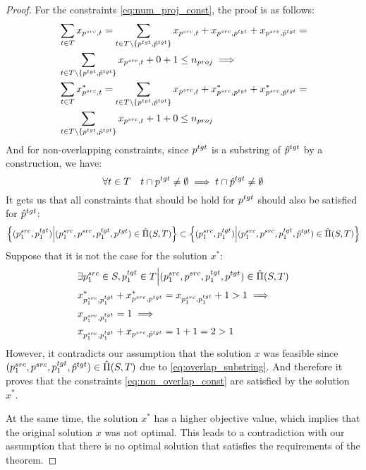 \begin{proof}
  For the constraints \eqref{eq:num_proj_const}, the proof is as follows:
  \begin{align*}
    & \sum\limits_{t \in T} x_{p^{src}, t} =
    \sum\limits_{t \in T \setminus \{ p^{tgt}, \hat{p}^{tgt} \}} x_{p^{src}, t} + x_{p^{src}, p^{tgt}} + x_{p^{src}, \hat{p}^{tgt}}  =     \\
    & \sum\limits_{t \in T \setminus \{ p^{tgt}, \hat{p}^{tgt} \}} x_{p^{src}, t} + 0 + 1
    \leq n_{proj} \implies                                                                                                                 \\
    & \sum\limits_{t \in T} x^*_{p^{src}, t} =
    \sum\limits_{t \in T \setminus \{ p^{tgt}, \hat{p}^{tgt} \}} x_{p^{src}, t} + x^*_{p^{src}, p^{tgt}} + x^*_{p^{src}, \hat{p}^{tgt}}  = \\
    & \sum\limits_{t \in T \setminus \{ p^{tgt}, \hat{p}^{tgt} \}} x_{p^{src}, t} + 1 + 0 \leq n_{proj}
  \end{align*}
  And for non-overlapping constraints, since \( p^{tgt} \) is a substring of \( \hat{p}^{tgt} \) by a
  construction, we have:
  \[
    \forall t \in T \quad t \cap p^{tgt} \neq \emptyset \implies t \cap \hat{p}^{tgt} \neq \emptyset
  \]
  It gets us that all constraints that should be hold for \( p^{tgt} \) should also be satisfied for \( \hat{p}^{tgt} \):
  \begin{equation} \label{eq:overlap_substring}
    \left\{ (p_1^{src}, p_1^{tgt}) \Big| (p_1^{src}, p^{src}, p_1^{tgt}, p^{tgt}) \in \hat{\Pi}(S, T) \right\} \subset
    \left\{ (p_1^{src}, p_1^{tgt}) \Big| (p_1^{src}, p^{src}, p_1^{tgt}, \hat{p}^{tgt}) \in \hat{\Pi}(S, T) \right\}
  \end{equation}
  Suppose that it is not the case for the solution \( x^* \):
  \begin{align*}
    & \exists p_1^{src} \in S, p_1^{tgt} \in T \Big| (p_1^{src}, p^{src}, p_1^{tgt}, p^{tgt}) \in \hat{\Pi}(S, T) \\
    & x^*_{p_1^{src}, p_1^{tgt}} + x^*_{p^{src}, p^{tgt}} =
    x_{p_1^{src}, p_1^{tgt}} + 1 > 1 \implies                                                                      \\
    & x_{p_1^{src}, p_1^{tgt}} = 1
    \implies                                                                                                       \\
    & x_{p_1^{src}, p_1^{tgt}} + x_{p^{src}, \hat{p}^{tgt}} = 1 + 1 = 2 > 1
  \end{align*}
  However, it contradicts our assumption that the solution \( x \) was feasible
  since \linebreak \( (p_1^{src}, p^{src}, p_1^{tgt}, \hat{p}^{tgt}) \in \hat{\Pi}(S, T) \)
  due to \eqref{eq:overlap_substring}.
  And therefore it proves that the constraints \eqref{eq:non_overlap_const} are satisfied by the
  solution~\( x^* \).

  At the same time, the solution \( x^* \) has a higher objective value, which
  implies that the original solution \( x \) was not optimal. This leads to a
  contradiction with our assumption that there is no optimal solution that satisfies
  the requirements of the theorem.
\end{proof}
